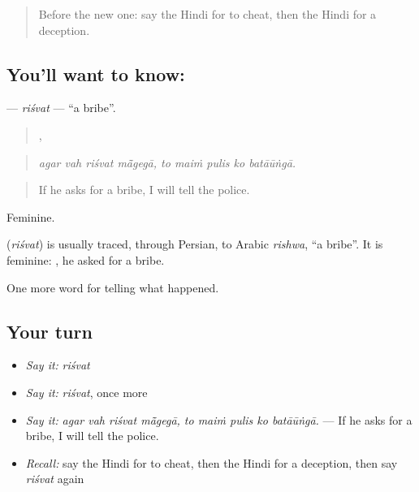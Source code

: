 \label{lesson:HI-C293-risvat}



\begin{quote}
Before the new one: say the Hindi for to cheat, then the Hindi for a deception.
\end{quote}

\subsection*{You'll want to know: }
\textbf{} — \emph{riśvat} — \textquotedblleft{}a bribe\textquotedblright{}.

\begin{quote}
   ,     
\end{quote}

\begin{quote}
\emph{agar vah riśvat mā̃gegā, to maiṁ pulis ko batāūṅgā.}
\end{quote}

\begin{quote}
If he asks for a bribe, I will tell the police.
\end{quote}

Feminine.

\begin{cousinweb}
\textbf{} (\emph{riśvat}) is usually traced, through Persian, to Arabic \emph{rishwa}, \textquotedblleft{}a bribe\textquotedblright{}. It is feminine: \textbf{  }, he asked for a bribe.
\end{cousinweb}

\begin{grammarlens}[title={What you've built}]
One more word for telling what happened.
\end{grammarlens}

\subsection*{Your turn}
\begin{itemize}
\raggedright
  \item \emph{Say it:} \emph{riśvat}
  \item \emph{Say it:} \emph{riśvat}, once more
  \item \emph{Say it:} \emph{agar vah riśvat mā̃gegā, to maiṁ pulis ko batāūṅgā.} — If he asks for a bribe, I will tell the police.
  \item \emph{Recall:} say the Hindi for to cheat, then the Hindi for a deception, then say \emph{riśvat} again
\end{itemize}

